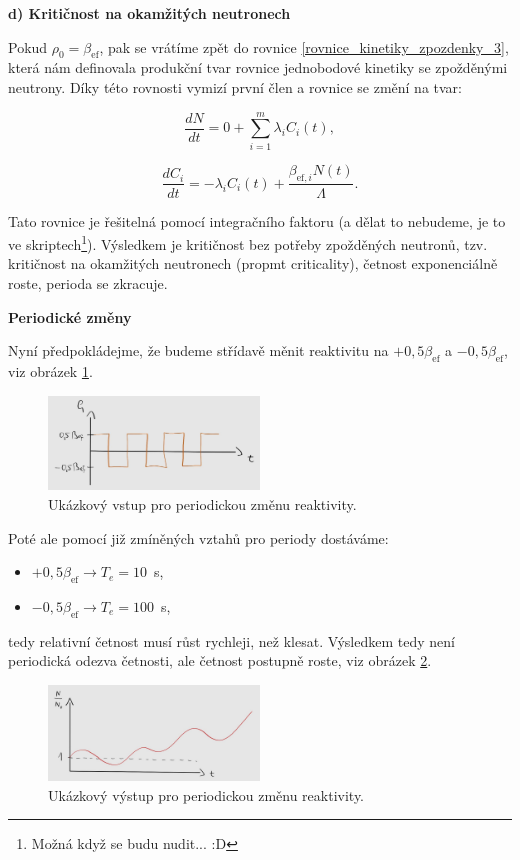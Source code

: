 \textbf{d) Kritičnost na okamžitých neutronech}

Pokud $\rho_0 = \beta_{\text{ef}}$, pak se vrátíme zpět do rovnice \eqref{rovnice_kinetiky_zpozdenky_3}, která nám definovala produkční tvar rovnice jednobodové kinetiky se zpožděnými neutrony. Díky této rovnosti vymizí první člen a rovnice se změní na tvar:

$$ \dfrac{dN}{dt} = 0 + \sum_{i=1}^m \lambda_i C_i(t), $$

$$ \dfrac{dC_i}{dt} = -\lambda_i C_i(t) + \dfrac{\beta_{\text{ef},i}  N(t)}{\Lambda}. $$

Tato rovnice je řešitelná pomocí integračního faktoru (a dělat to nebudeme, je to ve skriptech\footnote{Možná když se budu nudit... :D}). Výsledkem je kritičnost bez potřeby zpožděných neutronů, tzv. kritičnost na okamžitých neutronech (propmt criticality), četnost exponenciálně roste, perioda se zkracuje.

\textbf{Periodické změny}

Nyní předpokládejme, že budeme střídavě měnit reaktivitu na $+ 0,5 \beta_{\text{ef}}$ a $- 0,5 \beta_{\text{ef}}$, viz obrázek \ref{fig_periodicke}.

\begin{figure}[H]
  \centering
  \includegraphics[width=0.5\textwidth]{img/periodicke.jpg}
  \caption{Ukázkový vstup pro periodickou změnu reaktivity.}
  \label{fig_periodicke}
\end{figure}

Poté ale pomocí již zmíněných vztahů pro periody dostáváme:

\begin{itemize}
  \item $+ 0,5 \beta_{\text{ef}} \rightarrow T_e = 10$~s,
  \item $- 0,5 \beta_{\text{ef}} \rightarrow T_e = 100$~s,
\end{itemize}

tedy relativní četnost musí růst rychleji, než klesat. Výsledkem tedy není periodická odezva četnosti, ale četnost postupně roste, viz obrázek \ref{fig_periodicke_reseni}.

\begin{figure}[H]
  \centering
  \includegraphics[width=0.5\textwidth]{img/periodicke_reseni.jpg}
  \caption{Ukázkový výstup pro periodickou změnu reaktivity.}
  \label{fig_periodicke_reseni}
\end{figure}

